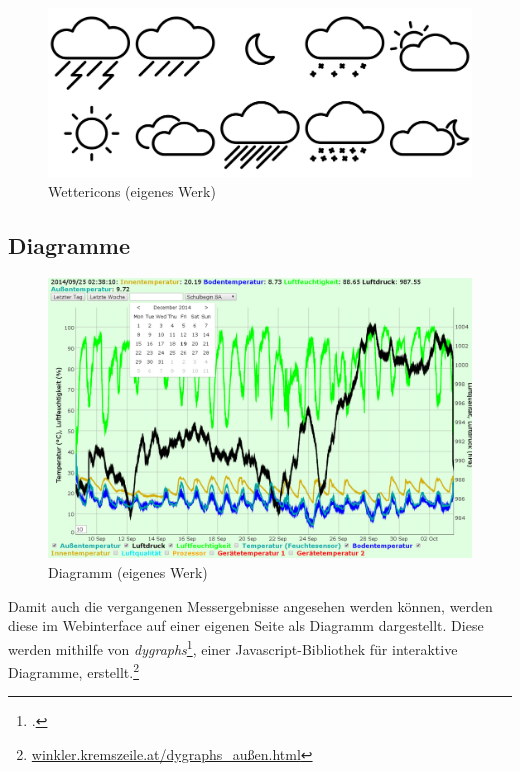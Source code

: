 \begin{figure}[h]
  \centering
     \includegraphics[width=\textwidth]{figures/wettericons.png}
  \caption{Wettericons (eigenes Werk)}
  \label{fig:wettericons}
\end{figure}

\subsection{Diagramme}
\label{subsec:Diagramme}
\begin{figure}[h]
  \centering
     \includegraphics[width=\textwidth]{figures/dygraphs.png}
  \caption{Diagramm (eigenes Werk)}
  \label{fig:dygraphs}
\end{figure}
Damit auch die vergangenen Messergebnisse angesehen werden können, werden diese im Webinterface auf einer eigenen Seite als Diagramm dargestellt. Diese werden mithilfe von \emph{dygraphs}\footcite{dygraphs}, einer \gls{Javascript}-Bibliothek für interaktive Diagramme, erstellt.\footnote{\href{http://winkler.kremszeile.at/dygraphs_au\%C3\%9Fen.html}{winkler.kremszeile.at/dygraphs\_außen.html}}

